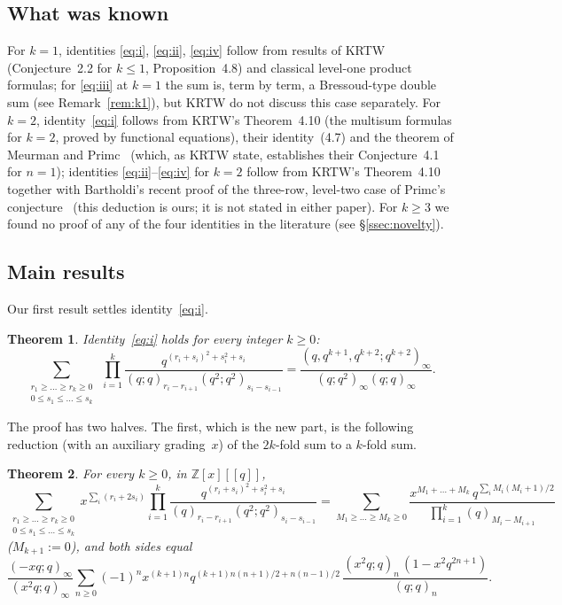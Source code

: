\documentclass[11pt]{amsart}
\newtheorem{theorem}{Theorem}[section]
\theoremstyle{definition}
\numberwithin{equation}{section}
\newcommand{\Z}{\mathbb{Z}}
\begin{document}
\subsection{What was known}\label{ssec:known}
For $k=1$, identities \eqref{eq:i}, \eqref{eq:ii}, \eqref{eq:iv} follow from results of KRTW
(Conjecture~2.2 for $k\le1$, Proposition~4.8) and classical level-one product formulas; for
\eqref{eq:iii} at $k=1$ the sum is, term by term, a Bressoud-type double sum (see
Remark~\ref{rem:k1}), but KRTW do not discuss this case separately. For $k=2$, identity~\eqref{eq:i}
follows from KRTW's Theorem~4.10 (the multisum formulas for $k=2$, proved by functional equations), their
identity~(4.7) and the theorem of Meurman and Primc~\cite{MP} (which, as KRTW state, establishes their
Conjecture~4.1 for $n=1$); identities \eqref{eq:ii}--\eqref{eq:iv} for $k=2$ follow from KRTW's
Theorem~4.10 together with Bartholdi's recent proof of the three-row, level-two case of Primc's
conjecture~\cite{Bartholdi} (this deduction is ours; it is not stated in either paper). For $k\ge3$ we
found no proof of any of the four identities in the literature (see §\ref{ssec:novelty}).

\subsection{Main results}
Our first result settles identity~\eqref{eq:i}.

\begin{theorem}\label{thm:main}
Identity~\eqref{eq:i} holds for every integer $k\ge0$:
\[
\sum_{\substack{r_1\ge\dots\ge r_k\ge0\\ 0\le s_1\le\dots\le s_k}}\ \prod_{i=1}^k
\frac{q^{(r_i+s_i)^2+s_i^2+s_i}}{(q;q)_{r_i-r_{i+1}}(q^2;q^2)_{s_i-s_{i-1}}}
=\frac{(q,q^{k+1},q^{k+2};q^{k+2})_\infty}{(q;q^2)_\infty(q;q)_\infty}.
\]
\end{theorem}

The proof has two halves. The first, which is the new part, is the following reduction (with an
auxiliary grading~$x$) of the $2k$-fold sum to a $k$-fold sum.

\begin{theorem}\label{thm:x}
For every $k\ge0$, in $\Z[x][[q]]$,
\begin{equation}\label{eq:xref}
\sum_{\substack{r_1\ge\dots\ge r_k\ge0\\0\le s_1\le\dots\le s_k}} x^{\sum_i(r_i+2s_i)}\prod_{i=1}^k
\frac{q^{(r_i+s_i)^2+s_i^2+s_i}}{(q)_{r_i-r_{i+1}}(q^2;q^2)_{s_i-s_{i-1}}}
=\sum_{M_1\ge\dots\ge M_k\ge0}\frac{x^{M_1+\dots+M_k}\,q^{\sum_iM_i(M_i+1)/2}}{\prod_{i=1}^k(q)_{M_i-M_{i+1}}}
\end{equation}
($M_{k+1}:=0$), and both sides equal
\begin{equation}\label{eq:melclosed}
\frac{(-xq;q)_\infty}{(x^2q;q)_\infty}\sum_{n\ge0}(-1)^nx^{(k+1)n}q^{(k+1)n(n+1)/2+n(n-1)/2}\,
\frac{(x^2q;q)_n\,(1-x^2q^{2n+1})}{(q;q)_n}.
\end{equation}
\end{theorem}
\end{document}
